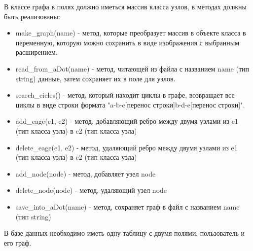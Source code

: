 В классе графа в полях должно иметься массив класса узлов, в методах должны быть реализованы:
\begin{itemize}
\item make\_graph(name) - метод, которые преобразует массив в объекте класса в переменную, которую можно сохранить в виде изображения с выбранным расширением.
\item read\_from\_aDot(name) - метод, читающей из файла с названием name (тип string) данные, затем сохраняет их в поле для узлов. 
\item search\_cicles() - метод, который находит циклы в графе, возвращает все циклы в виде строки формата "a-b-c[перенос строки]b-d-e[перенос строки]".
\item add\_eage(e1, e2) - метод, добавляющий ребро между двумя узлами из e1 (тип класса узла) в e2 (тип класса узла)
\item delete\_eage(e1, e2) - метод, удаляющий ребро между двумя узлами из e1 (тип класса узла) в e2 (тип класса узла)
\item add\_node(node) - метод, добавляет узел node
\item delete\_node(node) - метод, удаляющий узел node
\item save\_into\_aDot(name) - метод, сохраняет граф в файл с названием name (тип string)
\end{itemize}

В базе данных необходимо иметь одну таблицу с двумя полями: пользователь и его граф.
